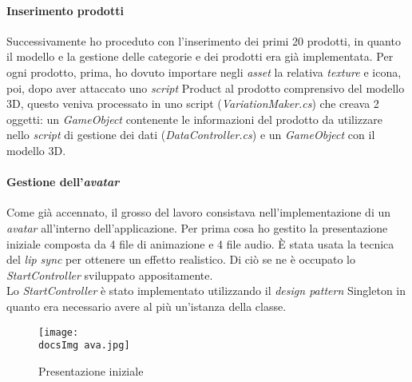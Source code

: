 \paragraph{Inserimento prodotti}
Successivamente ho proceduto con l'inserimento dei primi 20 prodotti, in quanto il modello e la gestione delle categorie e dei prodotti era gi\`a implementata. Per ogni prodotto, prima, ho dovuto importare negli \textit{asset\gloss} la relativa \textit{texture\gloss} e icona, poi, dopo aver attaccato uno \textit{script} Product al prodotto comprensivo del modello 3D, questo veniva processato in uno script (\textit{VariationMaker.cs}) che creava 2 oggetti: un \textit{GameObject} contenente le informazioni del prodotto da utilizzare nello \textit{script} di gestione dei dati (\textit{DataController.cs}) e un \textit{GameObject} con il modello 3D.\\

\paragraph{Gestione dell'\textit{avatar\gloss}}
Come gi\`a accennato, il grosso del lavoro consistava nell'implementazione di un \textit{avatar\gloss} all'interno dell'applicazione. Per prima cosa ho gestito la presentazione iniziale composta da 4 file di animazione e 4 file audio. \`E stata usata la tecnica del \textit{lip sync} per ottenere un effetto realistico. Di ci\`o se ne \`e occupato lo \textit{StartController} sviluppato appositamente.\\
Lo \textit{StartController} \`e stato implementato utilizzando il \textit{design pattern} Singleton in quanto era necessario avere al pi\`u un'istanza della classe.\\

	
	\begin{figure}[H]
		\centering
		\texttt{[image: \\docsImg ava.jpg]}
		\caption{Presentazione iniziale}
		\label{fig:Presentazione iniziale}
	\end{figure}

